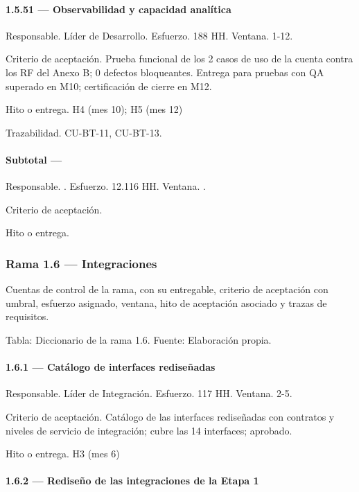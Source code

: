 \documentclass[11pt]{article}
\begin{document}
\paragraph{1.5.51 — Observabilidad y capacidad analítica}

Responsable. Líder de Desarrollo. Esfuerzo. 188 HH. Ventana. 1-12.

Criterio de aceptación. Prueba funcional de los 2 casos de uso de la cuenta contra los RF del Anexo B; 0 defectos bloqueantes. Entrega para pruebas con QA superado en M10; certificación de cierre en M12.

Hito o entrega. H4 (mes 10); H5 (mes 12)

Trazabilidad. CU-BT-11, CU-BT-13.

\paragraph{Subtotal — }

Responsable. . Esfuerzo. 12.116 HH. Ventana. .

Criterio de aceptación.

Hito o entrega.

\subsubsection{Rama 1.6 — Integraciones}

Cuentas de control de la rama, con su entregable, criterio de aceptación con umbral, esfuerzo asignado, ventana, hito de aceptación asociado y trazas de requisitos.

Tabla: Diccionario de la rama 1.6. Fuente: Elaboración propia.

\paragraph{1.6.1 — Catálogo de interfaces rediseñadas}

Responsable. Líder de Integración. Esfuerzo. 117 HH. Ventana. 2-5.

Criterio de aceptación. Catálogo de las interfaces rediseñadas con contratos y niveles de servicio de integración; cubre las 14 interfaces; aprobado.

Hito o entrega. H3 (mes 6)

\paragraph{1.6.2 — Rediseño de las integraciones de la Etapa 1}
\end{document}
